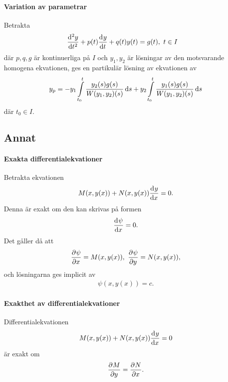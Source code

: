 \paragraph{Variation av parametrar}
Betrakta
\begin{align*}
	\deval[2]{y}{t}{t} + p(t)\deval{y}{t}{t} + q(t)y(t) &= g(t),\ t\in I
\end{align*}
där $p, q, g$ är kontinuerliga på $I$ och $y_{1}, y_{2}$ är lösningar av den motsvarande homogena ekvationen, ges en partikulär lösning av ekvationen av
\begin{align*}
	y_{\text{p}} = -y_{1}\int\limits_{t_{0}}^{t}\frac{y_{2}(s)g(s)}{W(y_{1}, y_{2})(s)}\dd{s} + y_{2}\int\limits_{t_{0}}^{t}\frac{y_{1}(s)g(s)}{W(y_{1}, y_{2})(s)}\dd{s}
\end{align*}
där $t_{0}\in I$.

\subsection{Annat}

\paragraph{Exakta differentialekvationer}
Betrakta ekvationen
\begin{align*}
	M(x, y(x)) + N(x, y(x))\dv[]{y}{x} (x) = 0.
\end{align*}
Denna är exakt om den kan skrivas på formen
\begin{align*}
	\dv[]{\psi}{x} (x, y(x)) = 0.
\end{align*}
Det gåller då att
\begin{align*}
	\pdv[]{\psi}{x} (x, y(x)) = M(x, y(x)),\ \pdv[]{\psi}{y} (x, y(x)) = N(x, y(x)),
\end{align*}
och lösningarna ges implicit av
\begin{align*}
	\psi(x, y(x)) = c.
\end{align*}

\paragraph{Exakthet av differentialekvationer}
Differentialekvationen
\begin{align*}
	M(x, y(x)) + N(x, y(x))\dv[]{y}{x} (x) = 0
\end{align*}
är exakt om
\begin{align*}
	\pdv[]{M}{y} (x, y(x)) = \pdv[]{N}{x} (x, y(x)).
\end{align*}

